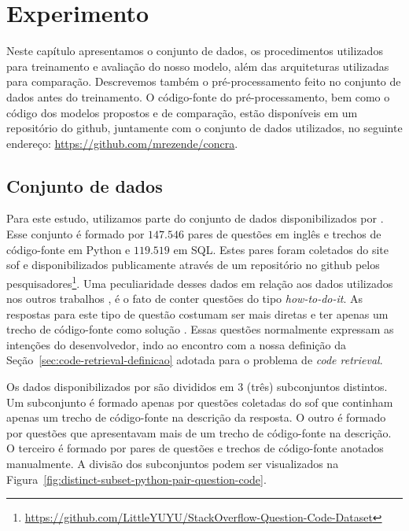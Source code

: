 \chapter{Experimento}
\label{cap:experimento}


Neste capítulo apresentamos o conjunto de dados, os procedimentos utilizados para treinamento e avaliação do nosso modelo, além das arquiteturas utilizadas para comparação. Descrevemos também o pré-processamento feito no conjunto de dados antes do treinamento. O código-fonte do pré-processamento, bem como o código dos modelos propostos e de comparação, estão disponíveis em um repositório do \Gls{github},  juntamente com o conjunto de dados utilizados, no seguinte endereço: \url{https://github.com/mrezende/concra}.



\section{Conjunto de dados}
\label{sec:conjunto-dados}

Para este estudo, utilizamos parte do conjunto de dados disponibilizados por \cite{yao-2018}. Esse conjunto é formado por $\bm{147.546}$ pares de questões em inglês e trechos de código-fonte em Python e $\bm{119.519}$ em SQL. Estes pares foram coletados do site \Gls{sof} e disponibilizados publicamente através de um repositório no \Gls{github} pelos pesquisadores\footnote{\url{https://github.com/LittleYUYU/StackOverflow-Question-Code-Dataset}}. Uma peculiaridade desses dados em relação aos dados utilizados nos outros trabalhos \cite{iyer-etal-2016-summarizing, Allamanis-bimodal-source-code-natural-language:2015}, é o fato de conter questões do tipo \textit{how-to-do-it}. As respostas para este tipo de questão costumam ser mais diretas e ter apenas um trecho de código-fonte como solução \citep{yao-2018}. Essas questões normalmente expressam as intenções do desenvolvedor, indo ao encontro com a nossa definição da Seção~\ref{sec:code-retrieval-definicao} adotada para o problema de \textit{code retrieval}.

Os dados disponibilizados por \cite{yao-2018} são divididos em 3 (três) subconjuntos distintos. Um subconjunto é formado apenas por questões coletadas do \Gls{sof} que continham apenas um trecho de código-fonte na descrição da resposta. O outro é formado por questões que apresentavam mais de um trecho de código-fonte na descrição. O terceiro é formado por pares de questões e trechos de código-fonte anotados manualmente. A divisão dos subconjuntos podem ser visualizados na Figura~\ref{fig:distinct-subset-python-pair-question-code}.


